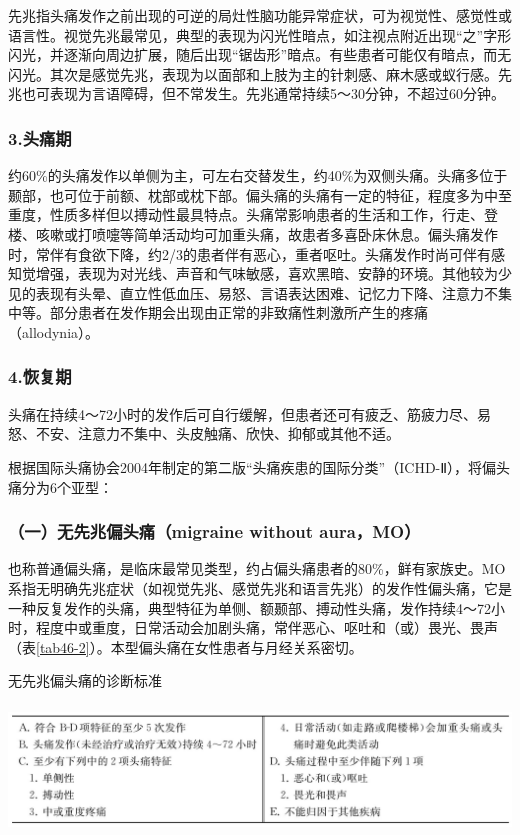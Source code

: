 先兆指头痛发作之前出现的可逆的局灶性脑功能异常症状，可为视觉性、感觉性或语言性。视觉先兆最常见，典型的表现为闪光性暗点，如注视点附近出现“之”字形闪光，并逐渐向周边扩展，随后出现“锯齿形”暗点。有些患者可能仅有暗点，而无闪光。其次是感觉先兆，表现为以面部和上肢为主的针刺感、麻木感或蚁行感。先兆也可表现为言语障碍，但不常发生。先兆通常持续5～30分钟，不超过60分钟。

\subsubsection{3.头痛期}

约60\%的头痛发作以单侧为主，可左右交替发生，约40\%为双侧头痛。头痛多位于颞部，也可位于前额、枕部或枕下部。偏头痛的头痛有一定的特征，程度多为中至重度，性质多样但以搏动性最具特点。头痛常影响患者的生活和工作，行走、登楼、咳嗽或打喷嚏等简单活动均可加重头痛，故患者多喜卧床休息。偏头痛发作时，常伴有食欲下降，约2/3的患者伴有恶心，重者呕吐。头痛发作时尚可伴有感知觉增强，表现为对光线、声音和气味敏感，喜欢黑暗、安静的环境。其他较为少见的表现有头晕、直立性低血压、易怒、言语表达困难、记忆力下降、注意力不集中等。部分患者在发作期会出现由正常的非致痛性刺激所产生的疼痛（allodynia）。

\subsubsection{4.恢复期}

头痛在持续4～72小时的发作后可自行缓解，但患者还可有疲乏、筋疲力尽、易怒、不安、注意力不集中、头皮触痛、欣快、抑郁或其他不适。

根据国际头痛协会2004年制定的第二版“头痛疾患的国际分类”（ICHD-Ⅱ），将偏头痛分为6个亚型：

\subsubsection{（一）无先兆偏头痛（migraine without aura，MO）}

也称普通偏头痛，是临床最常见类型，约占偏头痛患者的80\%，鲜有家族史。MO系指无明确先兆症状（如视觉先兆、感觉先兆和语言先兆）的发作性偏头痛，它是一种反复发作的头痛，典型特征为单侧、额颞部、搏动性头痛，发作持续4～72小时，程度中或重度，日常活动会加剧头痛，常伴恶心、呕吐和（或）畏光、畏声（表\ref{tab46-2}）。本型偏头痛在女性患者与月经关系密切。

\begin{table}[htbp]
\centering
\caption{无先兆偏头痛的诊断标准}
\label{tab46-2}
\includegraphics[width=5.90625in,height=1.34375in]{./images/Image00278.jpg}
\end{table}

